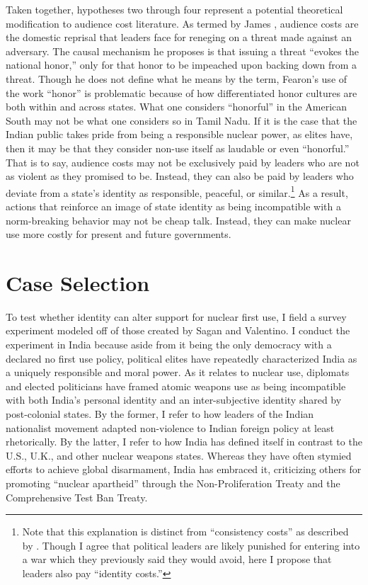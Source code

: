 \documentclass[12pt]{article}
\begin{document}
Taken together, hypotheses two through four represent a potential theoretical modification to audience cost literature. As termed by James \citet{fearon_domestic_1994}, audience costs are the domestic reprisal that leaders face for reneging on a threat made against an adversary. The causal mechanism he proposes is that issuing a threat “evokes the national honor,” only for that honor to be impeached upon backing down from a threat. Though he does not define what he means by the term, Fearon's use of the work “honor” is problematic because of how differentiated honor cultures are both within and across states. What one considers “honorful” in the American South may not be what one considers so in Tamil Nadu. If it is the case that the Indian public takes pride from being a responsible nuclear power, as elites have, then it may be that they consider non-use itself as laudable or even “honorful.” That is to say, audience costs may not be exclusively paid by leaders who are not as violent as they promised to be. Instead, they can also be paid by leaders who deviate from a state's identity as responsible, peaceful, or similar.\footnote{Note that this explanation is distinct from “consistency costs” as described by \citet{levy_backing_2015}. Though I agree that political leaders are likely punished for entering into a war which they previously said they would avoid, here I propose that leaders also pay “identity costs.”} As a result, actions that reinforce an image of state identity as being incompatible with a norm-breaking behavior may not be cheap talk. Instead, they can make nuclear use more costly for present and future governments.

\section{Case Selection}
To test whether identity can alter support for nuclear first use, I field a survey experiment modeled off of those created by Sagan and Valentino. I conduct the experiment in India because aside from it being the only democracy with a declared no first use policy, political elites have repeatedly characterized India as a uniquely responsible and moral power. As it relates to nuclear use, diplomats and elected politicians have framed atomic weapons use as being incompatible with both India's personal identity and an inter-subjective identity shared by post-colonial states. By the former, I refer to how leaders of the Indian nationalist movement adapted non-violence to Indian foreign policy at least rhetorically. By the latter, I refer to how India has defined itself in contrast to the U.S., U.K., and other nuclear weapons states. Whereas they have often stymied efforts to achieve global disarmament, India has embraced it, criticizing others for promoting “nuclear apartheid” through the Non-Proliferation Treaty and the Comprehensive Test Ban Treaty.
\end{document}
